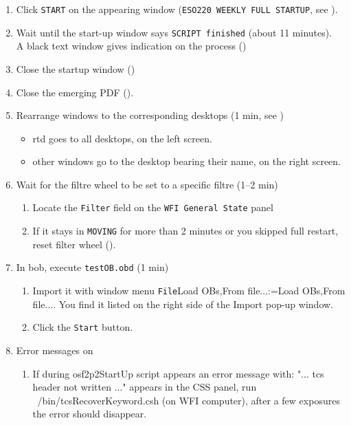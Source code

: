 \documentclass[11pt,fleqn,a4paper]{book}
\makeatletter
\def\menu#1#2{\texttt{#1}\ifx{}#2\else\@for\@x:=#2\do{$\rightarrow$\texttt{\@x}}\fi}
\def\wmenu#1#2{window menu \menu{#1}{#2}}
\def\fetchob{\wmenu{File}{Load OBs,From file...}}
\makeatother
\begin{document}
\begin{enumerate}
\begin{enumerate}
          \item Click \texttt{START} on the appearing window (\texttt{ESO220 WEEKLY FULL STARTUP}, see ). 
          \item Wait until the start-up window says \texttt{SCRIPT finished} (about 11 minutes).\\
          A black text window gives indication on the process ()
                \label{list:wfibooted}
          \item Close the startup window ()
          \item Close the emerging PDF ().
          \item Rearrange windows to the corresponding \gls{desktop}s (1 min, see )
             \label{list:wfiwin}
             \begin{itemize}
                \item \gls{rtd} goes to all \gls{desktop}s, on the left screen.
                \item other windows go to the \gls{desktop} bearing their name, on the right screen. 
            \end{itemize}
          \item Wait for the filtre wheel to be set to a specific filtre (1--2 min)\label{list:wfisu-filtre}
                \begin{enumerate}
                    \item Locate the \texttt{Filter} field on the \texttt{WFI \gls{General State}} panel
                    \item If it stays in \texttt{MOVING} for more than 2 minutes or you skipped full restart, reset filter wheel (). 
                \end{enumerate}
          \item In \gls{bob}, execute \texttt{testOB.obd} (1 min)
             \label{list:wfitest}
             \begin{enumerate}
               \item Import it with \fetchob. You find it listed on the right side of the Import pop-up window.
               \item Click the \texttt{Start} button. 
             \end{enumerate}
           \item Error messages on 
           \begin{enumerate}
           	\item  If during osf2p2StartUp script appears an error message with: "... tcs header not written ..." appears in the CSS panel, run ~/bin/tcsRecoverKeyword.csh (on WFI computer), after a few exposures the error should disappear.
           	

\end{enumerate}
\end{enumerate}
\end{enumerate}
\end{document}
